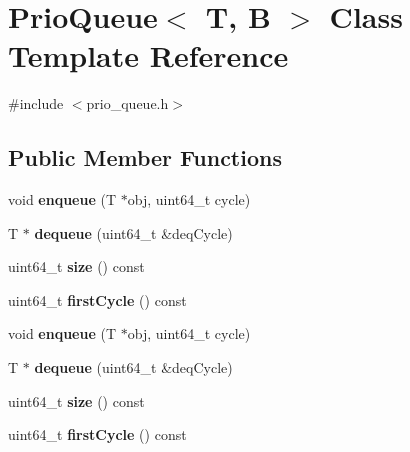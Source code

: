 \hypertarget{classPrioQueue}{\section{Prio\-Queue$<$ T, B $>$ Class Template Reference}
\label{classPrioQueue}
}


{\ttfamily \#include $<$prio\-\_\-queue.\-h$>$}

\subsection*{Public Member Functions}
\begin{DoxyCompactItemize}
\item 
\hypertarget{classPrioQueue_a8106fa16087b97ab98321a16d11a6016}{void {\bfseries enqueue} (T $\ast$obj, uint64\-\_\-t cycle)}\label{classPrioQueue_a8106fa16087b97ab98321a16d11a6016}

\item 
\hypertarget{classPrioQueue_a73dae2219e50b5246b1d4d6218b14c21}{T $\ast$ {\bfseries dequeue} (uint64\-\_\-t \&deq\-Cycle)}\label{classPrioQueue_a73dae2219e50b5246b1d4d6218b14c21}

\item 
\hypertarget{classPrioQueue_a5e1fa977f684d0b268cf6b368c539591}{uint64\-\_\-t {\bfseries size} () const }\label{classPrioQueue_a5e1fa977f684d0b268cf6b368c539591}

\item 
\hypertarget{classPrioQueue_a54194b3751c4b594bb9d1568a0a26749}{uint64\-\_\-t {\bfseries first\-Cycle} () const }\label{classPrioQueue_a54194b3751c4b594bb9d1568a0a26749}

\item 
\hypertarget{classPrioQueue_a8106fa16087b97ab98321a16d11a6016}{void {\bfseries enqueue} (T $\ast$obj, uint64\-\_\-t cycle)}\label{classPrioQueue_a8106fa16087b97ab98321a16d11a6016}

\item 
\hypertarget{classPrioQueue_a73dae2219e50b5246b1d4d6218b14c21}{T $\ast$ {\bfseries dequeue} (uint64\-\_\-t \&deq\-Cycle)}\label{classPrioQueue_a73dae2219e50b5246b1d4d6218b14c21}

\item 
\hypertarget{classPrioQueue_a5e1fa977f684d0b268cf6b368c539591}{uint64\-\_\-t {\bfseries size} () const }\label{classPrioQueue_a5e1fa977f684d0b268cf6b368c539591}

\item 
\hypertarget{classPrioQueue_a54194b3751c4b594bb9d1568a0a26749}{uint64\-\_\-t {\bfseries first\-Cycle} () const }\label{classPrioQueue_a54194b3751c4b594bb9d1568a0a26749}

\end{DoxyCompactItemize}


